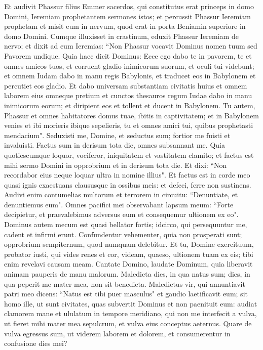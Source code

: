 \begin{biblechapter}  
\verse Et audivit Phassur filius Emmer sacerdos, qui constitutus erat princeps in domo Domini, Ieremiam prophetantem sermones istos; 
\verse et percussit Phassur Ieremiam prophetam et misit eum in nervum, quod erat in porta Beniamin superiore in domo Domini. 
\verse Cumque illuxisset in crastinum, eduxit Phassur Ieremiam de nervo; et dixit ad eum Ieremias: “Non Phassur vocavit Dominus nomen tuum sed Pavorem undique. 
\verse Quia haec dicit Dominus: Ecce ego dabo te in pavorem, te et omnes amicos tuos, et corruent gladio inimicorum suorum, et oculi tui videbunt; et omnem Iudam dabo in manu regis Babylonis, et traducet eos in Babylonem et percutiet eos gladio. 
\verse Et dabo universam substantiam civitatis huius et omnem laborem eius omneque pretium et cunctos thesauros regum Iudae dabo in manu inimicorum eorum; et diripient eos et tollent et ducent in Babylonem. 
\verse Tu autem, Phassur et omnes habitatores domus tuae, ibitis in captivitatem; et in Babylonem venies et ibi morieris ibique sepelieris, tu et omnes amici tui, quibus prophetasti mendacium". 
\verse Seduxisti me, Domine, et seductus sum; fortior me fuisti et invaluisti. Factus sum in derisum tota die, omnes subsannant me. 
\verse Quia quotiescumque loquor, vociferor, iniquitatem et vastitatem clamito; et factus est mihi sermo Domini in opprobrium et in derisum tota die. 
\verse Et dixi: “Non recordabor eius neque loquar ultra in nomine illius". Et factus est in corde meo quasi ignis exaestuans claususque in ossibus meis: et defeci, ferre non sustinens. 
\verse Audivi enim contumelias multorum et terrorem in circuitu: “Denuntiate, et denuntiemus eum". Omnes pacifici mei observabant lapsum meum: “Forte decipietur, et praevalebimus adversus eum et consequemur ultionem ex eo". 
\verse Dominus autem mecum est quasi bellator fortis; idcirco, qui persequuntur me, cadent et infirmi erunt. Confundentur vehementer, quia non prosperati sunt; opprobrium sempiternum, quod numquam delebitur. 
\verse Et tu, Domine exercituum, probator iusti, qui vides renes et cor, videam, quaeso, ultionem tuam ex eis; tibi enim revelavi causam meam. 
\verse Cantate Domino, laudate Dominum, quia liberavit animam pauperis de manu malorum. 
\verse Maledicta dies, in qua natus sum; dies, in qua peperit me mater mea, non sit benedicta. 
\verse Maledictus vir, qui annuntiavit patri meo dicens: “Natus est tibi puer masculus" et gaudio laetificavit eum; 
\verse sit homo ille, ut sunt civitates, quas subvertit Dominus et non paenituit eum: audiat clamorem mane et ululatum in tempore meridiano, 
\verse qui non me interfecit a vulva, ut fieret mihi mater mea sepulcrum, et vulva eius conceptus aeternus. 
\verse Quare de vulva egressus sum, ut viderem laborem et dolorem, et consumerentur in confusione dies mei? 
\end{biblechapter}


